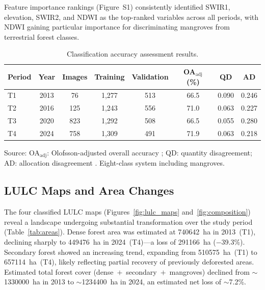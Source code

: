 \documentclass[12pt,a4paper]{article}
\begin{document}
Feature importance rankings (Figure~S1) consistently identified SWIR1, elevation, SWIR2, and NDWI as the top-ranked variables across all periods, with NDWI gaining particular importance for discriminating mangroves from terrestrial forest classes.

\begin{table}[!ht]
\caption{Classification accuracy assessment results.\label{tab:accuracy}}
\begin{threeparttable}
\begin{tabular*}{\textwidth}{@{\extracolsep{\fill}}lccccccc@{\extracolsep{\fill}}}
\toprule
Period & Year & Images & Training & Validation & OA$_\text{adj}$ (\%) & QD & AD \\
\midrule
T1 & 2013 & 76 & 1,277 & 513 & 66.5 & 0.090 & 0.246 \\
T2 & 2016 & 125 & 1,243 & 556 & 71.0 & 0.063 & 0.227 \\
T3 & 2020 & 823 & 1,292 & 508 & 66.5 & 0.055 & 0.280 \\
T4 & 2024 & 758 & 1,309 & 491 & 71.9 & 0.063 & 0.218 \\
\bottomrule
\end{tabular*}
\begin{tablenotes}
\item Source: OA$_\text{adj}$: Olofsson-adjusted overall accuracy \citep{Olofsson2014}; QD: quantity disagreement; AD: allocation disagreement \citep{Pontius2011}. Eight-class system including mangroves.
\end{tablenotes}
\end{threeparttable}
\end{table}

\subsection{LULC Maps and Area Changes}

The four classified LULC maps (Figures~\ref{fig:lulc_maps} and~\ref{fig:composition}) reveal a landscape undergoing substantial transformation over the study period (Table~\ref{tab:areas}). Dense forest area was estimated at \num{740642}~ha in 2013~(T1), declining sharply to \num{449476}~ha in 2024~(T4)---a loss of \num{291166}~ha ($-$39.3\%). Secondary forest showed an increasing trend, expanding from \num{510575}~ha~(T1) to \num{657114}~ha~(T4), likely reflecting partial recovery of previously deforested areas. Estimated total forest cover (dense~$+$~secondary~$+$~mangroves) declined from ${\sim}$\num{1330000}~ha in 2013 to ${\sim}$\num{1234400}~ha in 2024, an estimated net loss of ${\sim}$7.2\%.
\end{document}
